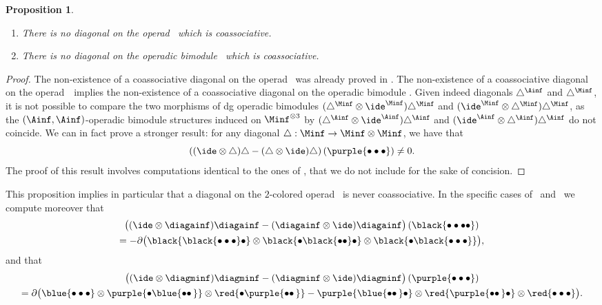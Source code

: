\documentclass[JEP,XML,SOM,NoFloatCountersInSection,Unicode,published]{cedram}
\newcommand{\twobullets}{\bullet\bullet\mkern3mu}
\theoremstyle{definition}
\theoremstyle{plain}
\newtheorem{proposition}[definition]{Proposition}
\begin{document}
\skpt
\begin{proposition}
\label{prop:nocoassoc}
\begin{enumerate}
\item There is no diagonal on the operad \Ainf\ which is coassociative.
\item There is no diagonal on the operadic bimodule \Minf\ which is coassociative.
\end{enumerate}
\end{proposition}

\begin{proof}
The non-existence of a coassociative diagonal on the operad \Ainf\ was already proved in \cite[\S 6]{MarklShnider06}.
The non-existence of a coassociative diagonal on the operad~\Ainf\ implies the non-existence of a coassociative diagonal on the operadic bimodule \Minf.
Given indeed diagonals $\triangle^{\Ainf}$ and $\triangle^{\Minf}$, it is not possible to compare the two morphisms of dg operadic bimodules $ (\triangle^{\Minf} \otimes \ide^{\Minf}) \triangle^{\Minf}$ and $(\ide^{\Minf} \otimes \triangle^{\Minf})\triangle^{\Minf}$, as the $(\Ainf, \Ainf)$-operadic bimodule structures induced on $\Minf^{\otimes 3}$ by $ (\triangle^{\Ainf} \otimes \ide^{\Ainf}) \triangle^{\Ainf}$ and $(\ide^{\Ainf} \otimes \triangle^{\Ainf}) \triangle^{\Ainf}$ do not coincide.
We can in fact prove a stronger result: for any diagonal $\triangle : \Minf \to \Minf \otimes \Minf$, we have that
\[
\left((\ide \otimes \triangle) \triangle - (\triangle \otimes \ide) \triangle \right) \left(\purple{\bullet \bullet \bullet} \right) \neq 0.
\]
The proof of this result involves computations identical to the ones of \cite[\S 6]{MarklShnider06}, that we do not include for the sake of concision.
\end{proof}

This proposition implies in particular that a diagonal on the $2$-colored operad \Ainfdeux\ is never coassociative.
In the specific cases of \diagainf\ and \diagminf\ we compute moreover that
\begin{multline*}
\bigl((\ide \otimes \diagainf) \diagainf - (\diagainf \otimes \ide) \diagainf \bigr) \left(\black{ \bullet \bullet \bullet \bullet } \right) \\
=  - \partial \bigl(\black{ \black{ \bullet \bullet \bullet } \bullet } \otimes \black{ \bullet \black{ \bullet \bullet } \bullet } \otimes \black{ \bullet \black{ \bullet \bullet \bullet } } \bigr),
\end{multline*}
and that
\begin{multline*}
\bigl((\ide \otimes \diagminf) \diagminf - (\diagminf \otimes \ide) \diagminf \bigr) \left(\purple{\bullet \bullet \bullet} \right) \\
= \partial \bigl(\blue{\bullet \bullet \bullet} \otimes \purple{ \bullet \blue{\twobullets}} \otimes \red{\bullet \purple{\twobullets}}
- \purple{\blue{\twobullets} \bullet} \otimes \red{\purple{\twobullets} \bullet} \otimes \red{\bullet \bullet \bullet}
\bigr).
\end{multline*}
\end{document}
